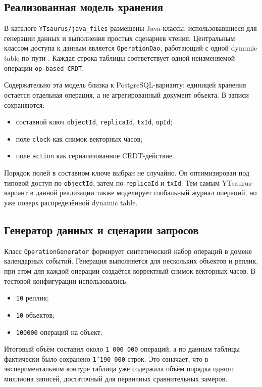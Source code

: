 \documentclass[a4paper,14pt]{extarticle}
\def\makefirstuc#1{#1}%
\def\normalsize{}%
\newcommand{\mysubsection}[1]{%
    \subsection{\normalsize\makefirstuc{#1}}
}
\begin{document}
\mysubsection{Реализованная модель хранения}

В каталоге \texttt{YTsaurus/java\_files} размещены Java-классы, использовавшиеся
для генерации данных и выполнения простых сценариев чтения. Центральным
классом доступа к данным является \texttt{OperationDao}, работающий с одной
dynamic table по пути . Каждая строка
таблицы соответствует одной неизменяемой операции \texttt{op-based CRDT}.

Содержательно эта модель близка к PostgreSQL-варианту: единицей хранения
остается отдельная операция, а не агрегированный документ объекта. В записи
сохраняются:
\begin{itemize}[leftmargin=1.25cm]
    \item составной ключ \texttt{objectId}, \texttt{replicaId}, \texttt{txId}, \texttt{opId};
    \item поле \texttt{clock} как снимок векторных часов;
    \item поле \texttt{action} как сериализованное CRDT-действие.
\end{itemize}

Порядок полей в составном ключе выбран не случайно. Он оптимизирован под
типовой доступ по \texttt{objectId}, затем по \texttt{replicaId} и
\texttt{txId}. Тем самым YTsaurus-вариант в данной реализации также моделирует
глобальный журнал операций, но уже поверх распределённой dynamic table.

\mysubsection{Генератор данных и сценарии запросов}

Класс \texttt{OperationGenerator} формирует синтетический набор операций в
домене календарных событий. Генерация выполняется для нескольких объектов и
реплик, при этом для каждой операции создаётся корректный снимок векторных
часов. В тестовой конфигурации использовались:
\begin{itemize}[leftmargin=1.25cm]
    \item \texttt{10} реплик;
    \item \texttt{10} объектов;
    \item \texttt{100000} операций на объект.
\end{itemize}

Итоговый объём составил около \texttt{1\,000\,000} операций, а по данным
таблицы фактически было сохранено \texttt{\~1\,190\,000} строк. Это означает,
что в экспериментальном контуре таблица уже содержала объём порядка одного
миллиона записей, достаточный для первичных сравнительных замеров.
\end{document}
